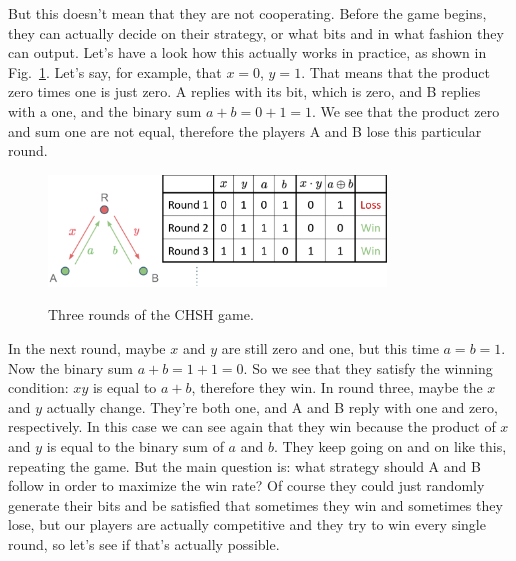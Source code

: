 But this doesn't mean that they are not cooperating. Before the game begins, they can actually decide on their strategy, or what bits and in what fashion they can output. Let's have a look how this actually works in practice, as shown in Fig.~\ref{fig:chsh-game-rounds}. Let's say, for example, that $x =0$, $y = 1$. That means that the product zero times one is just zero. A replies with its bit, which is zero, and B replies with a one, and the binary sum $a + b = 0 + 1 = 1$. We see that the product zero and sum one are not equal, therefore the players A and B lose this particular round.
\begin{figure}[H]
    \centering
    \includegraphics[width=0.8\textwidth]{lesson4/CHSH_rounds.pdf}
    \label{fig:chsh-game-rounds}
    \begin{center}
        \caption{Three rounds of the CHSH game.}
    \end{center}
\end{figure}

In the next round, maybe $x$ and $y$ are still zero and one, but this time $a = b = 1$. Now the binary sum $a + b = 1 + 1 = 0$. So we see that they satisfy the winning condition: $xy$ is equal to $a + b$, therefore they win. In round three, maybe the $x$ and $y$ actually change. They're both one, and A and B reply with one and zero, respectively. In this case we can see again that they win because the product of $x$ and $y$ is equal to the binary sum of $a$ and $b$. They keep going on and on like this, repeating the game. But the main question is: what strategy should A and B follow in order to maximize the win rate? Of course they could just randomly generate their bits and be satisfied that sometimes they win and sometimes they lose, but our players are actually competitive and they try to win every single round, so let's see if that's actually possible.

